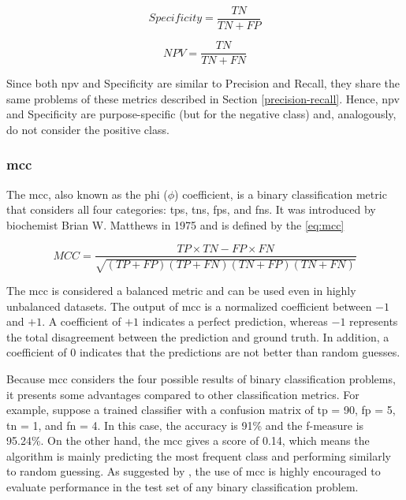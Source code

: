 \begin{equation}
\label{eq:specificity}
Specificity = \frac{TN}{TN + FP}
\end{equation}

\begin{equation}
\label{eq:npv}
NPV = \frac{TN}{TN + FN}
\end{equation}

Since both \acs{npv} and Specificity are similar to Precision and Recall, they share the same problems of these metrics described in Section \ref{precision-recall}. Hence, \acs{npv} and Specificity are purpose-specific (but for the negative class) and, analogously, do not consider the positive class.

\subsubsection{\acl{mcc}} \label{sec:mcc}

The \acf{mcc}, also known as the phi ($\phi$) coefficient, is a binary classification metric that considers all four categories: \aclp{tp}, \aclp{tn}, \aclp{fp}, and \aclp{fn}. It was introduced by biochemist Brian W. Matthews in 1975 \citep{matthews1975comparison} and is defined by the \autoref{eq:mcc}

\begin{equation}
\label{eq:mcc}
MCC = \frac{TP \times TN - FP \times FN}{\sqrt{(TP + FP)(TP + FN)(TN + FP)(TN + FN)}}
\end{equation}

The \acs{mcc} is considered a balanced metric and can be used even in highly unbalanced datasets. The output of \acs{mcc} is a normalized coefficient between $-1$ and $+1$. A coefficient of $+1$ indicates a perfect prediction, whereas $-1$ represents the total disagreement between the prediction and ground truth. In addition, a coefficient of $0$ indicates that the predictions are not better than random guesses. 

Because \acs{mcc} considers the four possible results of binary classification problems, it presents some advantages compared to other classification metrics. For example, suppose a trained classifier with a confusion matrix of \acs{tp} = 90, \acs{fp} = 5, \acs{tn} = 1, and \acs{fn} = 4. In this case, the accuracy is 91\% and the f-measure is 95.24\%. On the other hand, the \acs{mcc} gives a score of 0.14, which means the algorithm is mainly predicting the most frequent class and performing similarly to random guessing. As suggested by \cite{chicco2017ten}, the use of \acs{mcc} is highly encouraged to evaluate performance in the test set of any binary classification problem.

